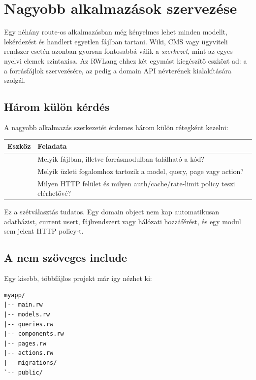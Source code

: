 \chapter{Nagyobb alkalmazások szervezése}

Egy néhány route-os alkalmazásban még kényelmes lehet minden modellt, lekérdezést és handlert egyetlen  fájlban tartani. Wiki, CMS vagy ügyviteli rendszer esetén azonban gyorsan fontosabbá válik a \emph{szerkezet}, mint az egyes nyelvi elemek szintaxisa. Az RWLang ehhez két egymást kiegészítő eszközt ad: a  a forrásfájlok szervezésére, az  pedig a domain API névterének kialakítására szolgál.

\section{Három külön kérdés}

A nagyobb alkalmazás szerkezetét érdemes három külön rétegként kezelni:

\begin{center}
\begin{tabularx}{\textwidth}{@{}l Y@{}}
\toprule
\textbf{Eszköz} & \textbf{Feladata} \\
\midrule
{} & Melyik fájlban, illetve forrásmodulban található a kód? \\
 & Melyik üzleti fogalomhoz tartozik a model, query, page vagy action? \\
 & Milyen HTTP felület és milyen auth/cache/rate-limit policy teszi elérhetővé? \\
\bottomrule
\end{tabularx}
\end{center}

Ez a szétválasztás tudatos. Egy domain object nem kap automatikusan adatbázist, current usert, fájlrendszert vagy hálózati hozzáférést, és egy modul sem jelent HTTP policy-t.

\section{A  nem szöveges include}

Egy kisebb, többfájlos projekt már így nézhet ki:

\begin{lstlisting}
myapp/
|-- main.rw
|-- models.rw
|-- queries.rw
|-- components.rw
|-- pages.rw
|-- actions.rw
|-- migrations/
`-- public/
\end{lstlisting}

